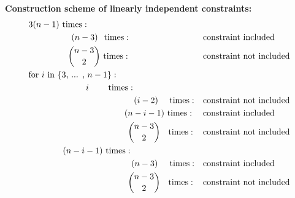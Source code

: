 \begin{theorem}
	\textbf{Construction scheme of linearly independent constraints:}
	\begin{align*}
	&\text{$3(n-1)$ times}: && \\
	&\hspace{50 pt} \text{$(n-3)$ \hspace{0.5 pt} times}:		&&\text{constraint included} \\
	&\hspace{46 pt} \binom{n-3}{2}\text{ times}:	&&\text{constraint not included} \\
	&\text{for $i$ in \{$3$, ... , $n-1$\}}: && \\
	&\hspace{67 pt}\text{$i$ \hspace{16 pt} times}: && \\
	&\hspace{123 pt}\text{$(i-2)$ \hspace{6.5 pt} times}: &&\text{constraint not included} \\
	&\hspace{112 pt}\text{$(n-i-1)$ times}:		&&\text{constraint included} \\
	&\hspace{116 pt}\binom{n-3}{2}\text{\hspace{6 pt} times}:	&&\text{constraint not included} \\
	&\hspace{40 pt}\text{$(n-i-1)$ times}: && \\
	&\hspace{120 pt}\text{$(n-3)$\hspace{10.5 pt} times}:		&&\text{constraint included} \\
	&\hspace{116 pt}\binom{n-3}{2}\text{\hspace{6 pt} times}:	&&\text{constraint not included}
	\end{align*}
	
\end{theorem}

\vspace{15 pt}

